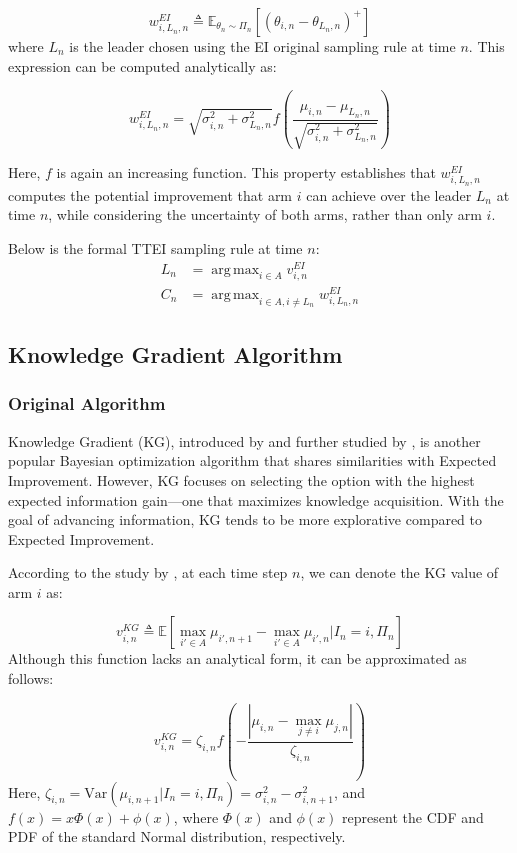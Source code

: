 \documentclass[a4paper, 12pt]{article}
\DeclareMathOperator{\argmax}{arg\,max}
\theoremstyle{definition}
\begin{document}
\[
w_{i,L_n,n}^{EI} \triangleq \mathbb{E}_{\theta_n\sim \Pi_n} [(\theta_{i,n}-\theta_{L_n,n})^+]
\]
where $L_n$ is the leader chosen using the EI original sampling rule at time $n$. This expression can be computed analytically as:

\[
w_{i,L_n,n}^{EI} = \sqrt{\sigma_{i,n}^2 + \sigma_{L_n,n}^2} f\left( \frac{\mu_{i,n}-\mu_{L_n,n}}{\sqrt{\sigma_{i,n}^2 + \sigma_{L_n,n}^2}}\right)
\]

Here, $f$ is again an increasing function. This property establishes that $w_{i,L_n,n}^{EI}$ computes the potential improvement that arm $i$ can achieve over the leader $L_n$ at time $n$, while considering the uncertainty of both arms, rather than only arm $i$.

Below is the formal TTEI sampling rule at time $n$:
\begin{align} \label{eq:ttei}
L_n & = \argmax_{i\in A} v_{i,n}^{EI} \nonumber \\
C_n & = \argmax_{i\in A,i\neq L_n} w_{i,L_n,n}^{EI}
\end{align}


\subsection{Knowledge Gradient Algorithm}
\subsubsection{Original Algorithm}
Knowledge Gradient (KG), introduced by \cite{knowledgegradient1} and further studied by \cite{knowledgegradient2}, is another popular Bayesian optimization algorithm that shares similarities with Expected Improvement. However, KG focuses on selecting the option with the highest expected information gain—one that maximizes knowledge acquisition. With the goal of advancing information, KG tends to be more explorative compared to Expected Improvement.

According to the study by \cite{kg}, at each time step $n$, we can denote the KG value of arm $i$ as:

\[
v_{i,n}^{KG} \triangleq \mathbb{E} \left[\max_{i' \in A} \mu_{i',n+1} - \max_{i' \in A} \mu_{i',n} \bigg| I_n = i, \Pi_n \right]
\]
Although this function lacks an analytical form, it can be approximated as follows:

\[
v_{i,n}^{KG} = \zeta_{i,n} f\left(-\frac{|\mu_{i,n}-\max_{j\neq i} \mu_{j,n}|}{\zeta_{i,n}}\right)
\]
Here, $\zeta_{i,n} = \mathrm{Var}(\mu_{i,n+1}|I_n = i, \Pi_n) = \sigma_{i,n}^2 - \sigma_{i,n+1}^2$, and $f(x) = x \Phi(x) + \phi(x)$, where $\Phi(x)$ and $\phi(x)$ represent the CDF and PDF of the standard Normal distribution, respectively.
\end{document}
